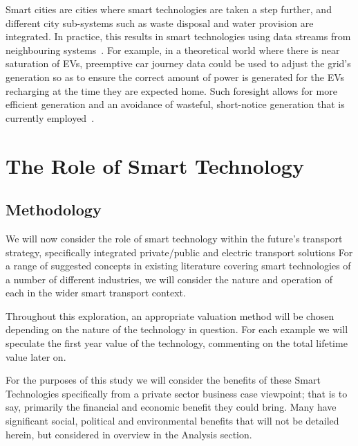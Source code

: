 \documentclass[conference]{IEEEtran}
\begin{document}
Smart cities are cities where smart technologies are taken a step
further, and different city sub-systems such as waste disposal and
water provision are integrated. In practice, this results in smart
technologies using data streams from neighbouring
systems~\cite{shapiro:2006}. For example, in a theoretical world where
there is near saturation of EVs, preemptive car journey data could be
used to adjust the grid’s generation so as to ensure the correct
amount of power is generated for the EVs recharging at the time they
are expected home. Such foresight allows for more efficient generation
and an avoidance of wasteful, short-notice generation that is
currently employed~\cite{tsoukalas:2008}.

\section{The Role of Smart Technology}

\subsection{Methodology}

We will now consider the role of smart technology within the future’s
transport strategy, specifically integrated private/public and
electric transport solutions For a range of suggested concepts in
existing literature covering smart technologies of a number of
different industries, we will consider the nature and operation of
each in the wider smart transport context.



Throughout this exploration, an appropriate valuation method will be
chosen depending on the nature of the technology in question. For each
example we will speculate the first year value of the technology,
commenting on the total lifetime value later on.

For the purposes of this study we will consider the benefits of these
Smart Technologies specifically from a private sector business case
viewpoint; that is to say, primarily the financial and economic
benefit they could bring. Many have significant social, political and
environmental benefits that will not be detailed herein, but
considered in overview in the Analysis section.
\end{document}
